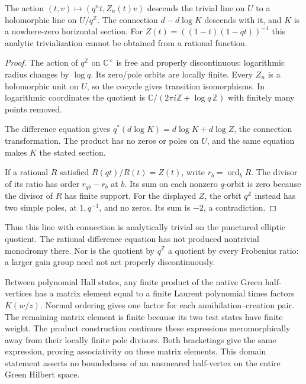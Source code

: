 \begin{proposition}\label{v4-arith:curve:prop:difference-line}
The action $(t,v)\mapsto(q^nt,Z_n(t)v)$ descends the trivial
line on $U$ to a holomorphic line on $U/q^{\mathbb Z}$.
The connection $d-d\log K$ descends with it, and $K$ is a
nowhere-zero horizontal section. For
$Z(t)=((1-t)(1-qt))^{-1}$ this analytic trivialization cannot
be obtained from a rational function.
\end{proposition}
\begin{proof}
The action of $q^{\mathbb Z}$ on $\mathbb C^\times$ is free
and properly discontinuous: logarithmic radius changes by
$\log q$. Its zero/pole orbits are locally finite.
Every $Z_n$ is a holomorphic unit on $U$, so the cocycle gives
transition isomorphisms. In logarithmic coordinates the quotient
is $\mathbb C/(2\pi i\mathbb Z+\log q\,\mathbb Z)$ with finitely
many points removed.

The difference equation gives
$q^*(d\log K)=d\log K+d\log Z$, the connection transformation.
The product has no zeros or poles on $U$, and the same
equation makes $K$ the stated section.

If a rational $R$ satisfied $R(qt)/R(t)=Z(t)$, write
$r_b=\operatorname{ord}_b R$. The divisor of its ratio has
order $r_{qb}-r_b$ at $b$. Its sum on each nonzero $q$-orbit
is zero because the divisor of $R$ has finite support.
For the displayed $Z$, the orbit $q^{\mathbb Z}$ instead has
two simple poles, at $1,q^{-1}$, and no zeros. Its sum is
$-2$, a contradiction.
\end{proof}

Thus this line with connection is analytically trivial on the
punctured elliptic quotient. The rational difference equation
has not produced nontrivial monodromy there.
Nor is the quotient by $q^{\mathbb Z}$ a quotient by every
Frobenius ratio: a larger gain group need not act properly
discontinuously.

Between polynomial Hall states, any finite product of the
native Green half-vertices has a matrix element equal to a
finite Laurent polynomial times factors $K(w/z)$.
Normal ordering gives one factor for each annihilation--creation
pair. The remaining matrix element is finite because its two
test states have finite weight. The product construction
continues these expressions meromorphically away from their
locally finite pole divisors. Both bracketings give the same
expression, proving associativity on these matrix elements.
This domain statement asserts no boundedness of an unsmeared
half-vertex on the entire Green Hilbert space.

